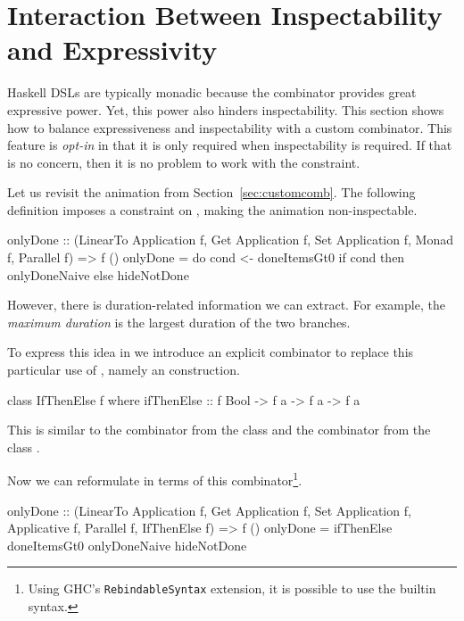 \section{Interaction Between Inspectability and Expressivity}
\label{sec:interaction}

Haskell DSLs are typically monadic because the \hs{>>=} combinator provides
great expressive power. Yet, this power also hinders inspectability. This section shows how to balance 
expressiveness and inspectability with a custom combinator. This feature is \emph{opt-in} in that it is only required when inspectability is required. If that is no concern, then it is no problem to work with the  constraint.

Let us revisit the  animation from Section~\ref{sec:customcomb}. The following definition imposes a  constraint on , making the animation non-inspectable.

\begin{spec}
onlyDone :: (LinearTo Application f, Get Application f,
  Set Application f, Monad f, Parallel f) => f ()
onlyDone = do
  cond <- doneItemsGt0
  if cond then onlyDoneNaive else hideNotDone
\end{spec}

However, there is duration-related information we can extract.
For example, the \emph{maximum duration} is the largest
duration of the two branches.

To express this idea in \dsl{} we introduce an explicit combinator to replace
this particular use of \hs{>>=}, namely an  construction. 

\begin{code}
class IfThenElse f where
  ifThenElse :: f Bool -> f a -> f a -> f a
\end{code}

This is similar to the  combinator from the  class
\cite{DBLP:phd/ethos/Yallop10} and the  combinator from the
 class \cite{Mokhov:2019:SAF:3352468.3341694}.

Now we can reformulate  in terms of this  combinator\footnote{Using GHC's \texttt{RebindableSyntax} extension, it is possible to use the builtin  syntax.}.

\begin{code}
onlyDone :: (LinearTo Application f, Get Application f,
  Set Application f, Applicative f, Parallel f, IfThenElse f)
  => f ()
onlyDone = ifThenElse doneItemsGt0 onlyDoneNaive hideNotDone
\end{code}

